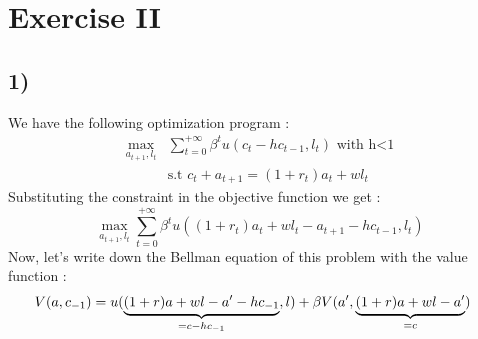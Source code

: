 \documentclass{article}
\begin{document}
\section{Exercise II}

\subsection{1)}
We have the following optimization program : 
$$\begin{aligned}\max_{a_{t+1},l_t}&\sum_{t=0}^{+\infty}\beta^tu(c_t-hc_{t-1},l_t) \text { with h<1}\\
&\text{s.t } c_t+a_{t+1}=(1+r_t)a_t+wl_t
\end{aligned}$$
Substituting the constraint in the objective function we get : 
$$\max_{a_{t+1},l_t}\sum_{t=0}^{+\infty} \beta^tu((1+r_t)a_t+wl_t-a_{t+1}-hc_{t-1},l_t)$$
Now, let's write down the Bellman equation of this problem with the value function : 
$$\begin{aligned}V(a,c_{-1}) &= u(\underbrace{(1+r)a+wl-a'-hc_{-1}}_{=c-hc_{-1}},l) + \beta V(a',\underbrace{(1+r)a+wl-a'}_{=c})
\end{aligned}\\
$$
\end{document}
